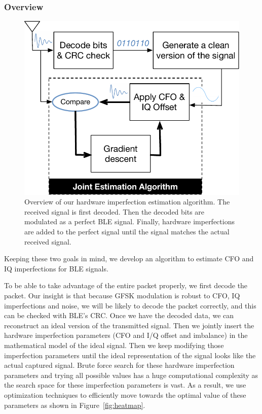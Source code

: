 \subsubsection{Overview}
%
\begin{figure}[t!]
    \centering
    \includegraphics[width = \linewidth]{plots/jointestimation.pdf} 
    \caption{Overview of our hardware imperfection estimation algorithm. The received signal is first decoded. Then the decoded bits are modulated as a perfect BLE signal. Finally, hardware imperfections are added to the perfect signal until the signal matches the actual received signal.}
    \label{fig:jointestimation}
\end{figure}

Keeping these two goals in mind, we develop an algorithm to estimate CFO and IQ
imperfections for BLE signals.
%


To be able to take advantage of the entire packet properly, we first
decode the packet. Our insight is that because GFSK modulation is robust to CFO, IQ imperfections and noise,
we will be likely to decode the packet correctly, and this can be checked with
BLE's CRC.
%
Once we have the decoded data, we can reconstruct an ideal version of
the transmitted signal.
%
Then we jointly insert the hardware imperfection parameters (CFO and I/Q offset and imbalance) in the
mathematical model of the ideal signal. Then we keep modifying those
imperfection parameters until the ideal representation of the signal
looks like the actual captured signal. Brute force search for these hardware imperfection parameters and trying all possible values has a huge computational complexity as the search space for
these imperfection parameters is vast. As a result, we use optimization techniques to efficiently move towards the optimal value of these parameters as shown in Figure~\ref{fig:heatmap}.

